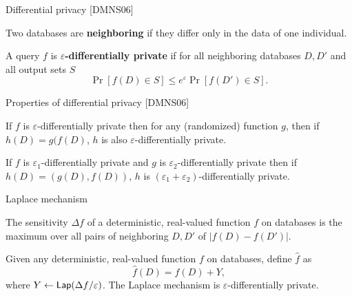 \documentclass{beamer}
\newcommand{\lap}{\ensuremath{{\sf Lap}}\xspace}
\begin{document}
\begin{frame}{Differential privacy [DMNS06]}

\begin{definition}
Two databases are \textbf{neighboring} if they differ only in the data of one individual.
\end{definition}
\pause
\begin{definition}
A query $f$ is \textbf{$\varepsilon$-differentially private} if for all neighboring databases $D, D'$ and all output sets $S$
\begin{equation*}
\Pr[f(D) \in S] \leq e^\varepsilon \Pr[f(D') \in S].
\end{equation*}
\end{definition}
\end{frame}

\begin{frame}{Properties of differential privacy [DMNS06]}
\begin{theorem}
If $f$ is $\varepsilon$-differentially private then for any (randomized) function $g$, then if $h(D) = g(f(D)$, $h$ is also $\varepsilon$-differentially private.
\end{theorem}
\pause
\begin{theorem}[Composition]
If $f$ is $\varepsilon_1$-differentially private and $g$ is $\varepsilon_2$-differentially private then if $h(D) = (g(D), f(D))$, $h$ is  $(\varepsilon_1+\varepsilon_2)$-differentially private.
\end{theorem}
\end{frame}

\begin{frame}{Laplace mechanism}
\begin{definition}[Sensitivity]
The sensitivity $\Delta f$ of a deterministic, real-valued function $f$ on databases is the maximum over all pairs of neighboring $D, D'$ of $| f(D) - f(D') |$.
\end{definition}

\pause
\begin{theorem}
Given any deterministic, real-valued function $f$ on databases, define $\widehat{f}$ as
$$\widehat{f}(D) = f(D) + Y,$$
where $Y \leftarrow \lap(\Delta f/\varepsilon)$. The Laplace mechanism is $\varepsilon$-differentially private.
\end{theorem}
\end{frame}
\end{document}
